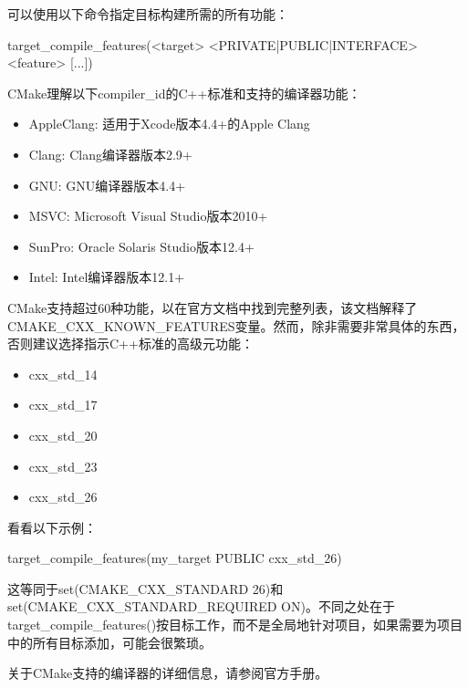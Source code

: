 可以使用以下命令指定目标构建所需的所有功能：

\begin{shell}
target_compile_features(<target> <PRIVATE|PUBLIC|INTERFACE>
                        <feature> [...])
\end{shell}

CMake理解以下compiler\_id的C++标准和支持的编译器功能：

\begin{itemize}
\item
AppleClang: 适用于Xcode版本4.4+的Apple Clang

\item
Clang: Clang编译器版本2.9+

\item
GNU: GNU编译器版本4.4+

\item
MSVC: Microsoft Visual Studio版本2010+

\item
SunPro: Oracle Solaris Studio版本12.4+

\item
Intel: Intel编译器版本12.1+
\end{itemize}

CMake支持超过60种功能，以在官方文档中找到完整列表，该文档解释了CMAKE\_CXX\_KNOWN\_FEATURES变量。然而，除非需要非常具体的东西，否则建议选择指示C++标准的高级元功能：

\begin{itemize}
\item
cxx\_std\_14

\item
cxx\_std\_17

\item
cxx\_std\_20

\item
cxx\_std\_23

\item
cxx\_std\_26
\end{itemize}

看看以下示例：

\begin{cmake}
target_compile_features(my_target PUBLIC cxx_std_26)
\end{cmake}

这等同于set(CMAKE\_CXX\_STANDARD 26)和set(CMAKE\_CXX\_STANDARD\_REQUIRED ON)。不同之处在于target\_compile\_features()按目标工作，而不是全局地针对项目，如果需要为项目中的所有目标添加，可能会很繁琐。

关于CMake支持的编译器的详细信息，请参阅官方手册。

